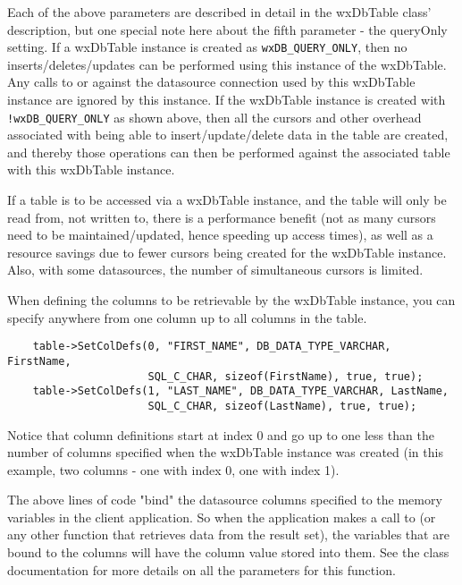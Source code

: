 Each of the above parameters are described in detail in the wxDbTable 
class' description, but one special note here about the fifth 
parameter - the queryOnly setting. If a wxDbTable instance is created as 
{\tt wxDB\_QUERY\_ONLY}, then no inserts/deletes/updates can be performed 
using this instance of the wxDbTable. Any calls to  
or  against the datasource 
connection used by this wxDbTable instance are ignored by this instance. If 
the wxDbTable instance is created with {\tt !wxDB\_QUERY\_ONLY} as shown above, 
then all the cursors and other overhead associated with being able to 
insert/update/delete data in the table are created, and thereby those 
operations can then be performed against the associated table with this 
wxDbTable instance.

If a table is to be accessed via a wxDbTable instance, and the table will 
only be read from, not written to, there is a performance benefit (not as 
many cursors need to be maintained/updated, hence speeding up access times), 
as well as a resource savings due to fewer cursors being created for the 
wxDbTable instance. Also, with some datasources, the number of 
simultaneous cursors is limited. 

When defining the columns to be retrievable by the wxDbTable instance, you 
can specify anywhere from one column up to all columns in the table. 

\begin{verbatim}
    table->SetColDefs(0, "FIRST_NAME", DB_DATA_TYPE_VARCHAR, FirstName,
                      SQL_C_CHAR, sizeof(FirstName), true, true);
    table->SetColDefs(1, "LAST_NAME", DB_DATA_TYPE_VARCHAR, LastName,
                      SQL_C_CHAR, sizeof(LastName), true, true);
\end{verbatim}

Notice that column definitions start at index 0 and go up to one less than 
the number of columns specified when the wxDbTable instance was created 
(in this example, two columns - one with index 0, one with index 1).

The above lines of code "bind" the datasource columns specified to the 
memory variables in the client application. So when the application 
makes a call to  (or any other function that retrieves 
data from the result set), the variables that are bound to the columns will 
have the column value stored into them. See the 
class documentation for more details on all the parameters for this function.

